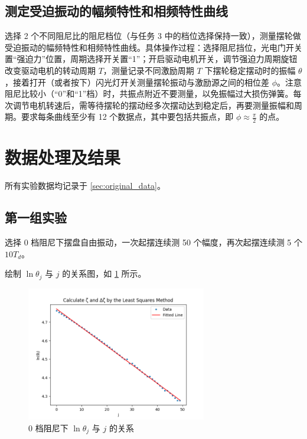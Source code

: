 \documentclass[12pt,a4paper]{amsart}
\begin{document}
\subsection{测定受迫振动的幅频特性和相频特性曲线}

选择 2 个不同阻尼比的阻尼档位（与任务 3 中的档位选择保持一致），测量摆轮做受迫振动的幅频特性和相频特性曲线。具体操作过程：选择阻尼挡位，光电门开关置“强迫力”位置，周期选择开关置“1”；开启驱动电机开关，调节强迫力周期旋钮改变驱动电机的转动周期 $T$，测量记录不同激励周期 $T$ 下摆轮稳定摆动时的振幅 $\theta$，接着打开（或者按下）闪光灯开关测量摆轮振动与激励源之间的相位差 $\phi$。注意阻尼比较小（“0”和“1”档）时，共振点附近不要测量，以免振幅过大损伤弹簧。每次调节电机转速后，需等待摆轮的摆动经多次摆动达到稳定后，再要测量振幅和周期。要求每条曲线至少有 12 个数据点，其中要包括共振点，即 $\phi\approx\frac{\pi}{2}$ 的点。

\section{数据处理及结果}

所有实验数据均记录于 \ref{sec:original_data}。

\subsection{第一组实验}

选择 0 档阻尼下摆盘自由振动，一次起摆连续测 50 个幅度，再次起摆连续测 5 个 $10T_d$。

绘制 $\ln\theta_j$ 与 $j$ 的关系图，如 \ref{fig:ln_theta_j} 所示。

\begin{figure}[H]
	\centering
	\includegraphics[width=0.7\textwidth]{img/A.png}
	\caption{0 档阻尼下 $\ln\theta_j$ 与 $j$ 的关系}
	\label{fig:ln_theta_j}
\end{figure}
\end{document}
